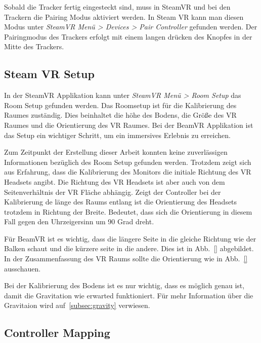 Sobald die Tracker fertig eingesteckt sind, muss in SteamVR und bei den Trackern die Pairing Modus aktiviert werden.
In Steam VR kann man diesen Modus unter \emph{SteamVR Menü > Devices > Pair Controller} gefunden werden.
Der Pairingmodus des Trackers erfolgt mit einem langen drücken des Knopfes in der Mitte des Trackers.

\subsection{Steam VR Setup}\label{subsec:steam-vr-setup}

In der SteamVR Applikation kann unter \emph{SteamVR Menü > Room Setup} das Room Setup gefunden werden.
Das Roomsetup ist für die Kalibrierung des Raumes zuständig.
Dies beinhaltet die höhe des Bodens, die Größe des VR Raumes und die Orientierung des VR Raumes.
Bei der BeamVR Applikation ist das Setup ein wichtiger Schritt, um ein immersives Erlebnis zu erreichen.

Zum Zeitpunkt der Erstellung dieser Arbeit konnten keine zuverlässigen Informationen bezüglich des Room Setup gefunden werden.
Trotzdem zeigt sich aus Erfahrung, dass die Kalibrierung des Monitors die initiale Richtung des VR Headsets angibt.
Die Richtung des VR Headsets ist aber auch von dem Seitenverhältnis der VR Fläche abhängig.
Zeigt der Controller bei der Kalibrierung de länge des Raums entlang ist die Orientierung des Headsets trotzdem in Richtung der Breite.
Bedeutet, dass sich die Orientierung in diesem Fall gegen den Uhrzeigersinn um 90 Grad dreht.

Für BeamVR ist es wichtig, dass die längere Seite in die gleiche Richtung wie der Balken schaut und die kürzere seite in die andere.
Dies ist in Abb.~\ref{} abgebildet.
In der Zusammenfassung des VR Raums sollte die Orientierung wie in Abb.~\ref{} ausschauen.


Bei der Kalibrierung des Bodens ist es nur wichtig, dass es möglich genau ist, damit die Gravitation wie erwarted funktioniert.
Für mehr Information über die Gravitaion wird auf~\ref{subsec:gravity} verwiesen.

\subsection{Controller Mapping}\label{subsec:controller-mapping}


